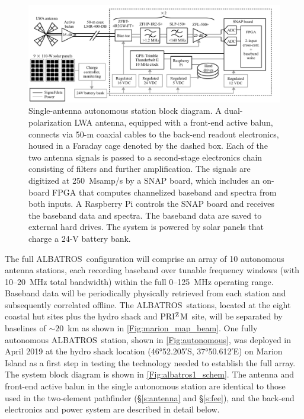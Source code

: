 \documentclass{ws-jai}
\def\albatros{ALBATROS}
\def\prizm{PRI$^{\rm Z}$M}
\begin{document}
\begin{figure}
  \begin{center}
    \includegraphics[width=\linewidth]{Figures/albatros_single_schematic/albatros_single_schematic.pdf}
    \caption{Single-antenna autonomous station block diagram.  A
      dual-polarization LWA antenna, equipped with a front-end active
      balun, connects via 50-m coaxial cables to the back-end readout
      electronics, housed in a Faraday cage denoted by the dashed box.
      Each of the two antenna signals is passed to a second-stage
      electronics chain consisting of filters and further
      amplification.  The signals are digitized at 250~Msamp/s by a
      SNAP board, which includes an on-board FPGA that computes
      channelized baseband and spectra from both inputs.  A Raspberry
      Pi controls the SNAP board and receives the baseband data and
      spectra.  The baseband data are saved to external hard drives.
      The system is powered by solar panels that charge a 24-V battery
      bank.}
    \label{Fig:albatros1_schem}
  \end{center}
\end{figure}

The full \albatros\ configuration will comprise an array of 10
autonomous antenna stations, each recording baseband over tunable
frequency windows (with 10--20~MHz total bandwidth) within the full
0--125~MHz operating range.  Baseband data will be periodically
physically retrieved from each station and subsequently correlated
offline.  The \albatros\ stations, located at the eight coastal hut
sites plus the hydro shack and \prizm\ site, will be separated by
baselines of $\sim20$~km as shown in
\autoref{Fig:marion_map_beam}. One fully autonomous
\albatros\ station, shown in \autoref{Fig:autonomous}, was deployed in
April 2019 at the hydro shack location (\ang{46;52.205;}S,
\ang{37;50.612;}E) on Marion Island as a first step in testing the
technology needed to establish the full array.  The system block
diagram is shown in \autoref{Fig:albatros1_schem}.  The antenna and
front-end active balun in the single autonomous station are identical
to those used in the two-element pathfinder (\S\ref{s:antenna} and
\S\ref{s:fee}), and the back-end electronics and power system are
described in detail below.
\end{document}
